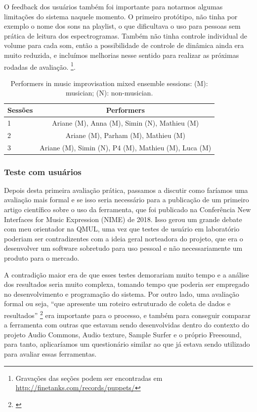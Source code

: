 O feedback dos usuários também foi importante para notarmos algumas limitações do sistema naquele momento. O primeiro protótipo, não tinha por exemplo o nome dos sons na playlist, o que dificultava o uso para pessoas sem prática de leitura dos espectrogramas. Também não tinha controle individual de volume para cada som, então a possibilidade de controle de dinâmica ainda era muito reduzida, e incluímos melhorias nesse sentido para realizar as próximas rodadas de avaliação.   \footnote{Gravações das seções podem ser encontradas em \url{http://finetanks.com/records/puppets/}}.

\begin{table}

\caption{Performers in music improvisation mixed ensemble sessions: (M): musician; (N): non-musician.}
\begin{tabular}{|lc|} \hline
Sessões & Performers \\ \hline
1 & Ariane (M), Anna (M), Simin (N), Mathieu (M)\\ \hline
2 & Ariane (M), Parham (M), Mathieu (M) \\ \hline
3 & Ariane (M), Simin (N), P4 (M), Mathieu (M), Luca (M)\\
\hline\end{tabular}
\label{tab:puppets}
\end{table}

\subsubsection{Teste com usuários}

Depois desta primeira avaliação prática, passamos a discutir como faríamos uma avaliação mais formal e se isso seria necessário para a publicação de um primeiro artigo científico sobre o uso da ferramenta, que foi publicado na Conferência New Interfaces for Music Expression (NIME) de 2018. Isso gerou um grande debate com meu orientador na QMUL, uma vez que testes de usuário em laboratório poderiam ser contradizentes com a ideia geral norteadora do projeto, que era o desenvolver um software sobretudo para uso pessoal e não necessariamente um produto para o mercado. 


A contradição maior era de que esses testes demorariam muito tempo e a análise dos resultados seria muito complexa, tomando tempo que poderia ser empregado no desenvolvimento e programação do sistema. Por outro lado, uma avaliação formal ou seja, ``que apresente um roteiro estruturado de coleta de dados e resultados'' \footnote{\cite{Stowell}} era importante para o processo, e também para conseguir comparar a ferramenta com outras que estavam sendo desenvolvidas dentro do contexto do projeto Audio Commons, Audio texture, Sample Surfer e o próprio Freesound, para tanto, aplicaríamos um questionário similar ao que já estava sendo utilizado para avaliar essas ferramentas.


